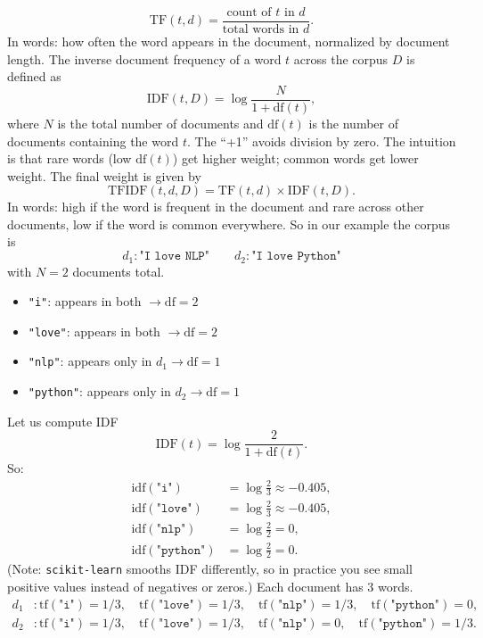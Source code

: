 \[
\mathrm{TF}(t,d) = \frac{\text{count of $t$ in $d$}}{\text{total words in $d$}}.
\]
In words: how often the word appears in the document, normalized by document length. The inverse document frequency of a word $t$ across the corpus $D$ is defined as
\[
\mathrm{IDF}(t,D) = \log \frac{N}{1 + \mathrm{df}(t)},
\]
where $N$ is the total number of documents and $\mathrm{df}(t)$ is the number of documents containing the word $t$. The ``+1'' avoids division by zero.  The intuition is that rare words (low $\mathrm{df}(t)$) get higher weight; common words get lower weight. The final weight is given by
\[
\mathrm{TFIDF}(t,d,D) = \mathrm{TF}(t,d) \times \mathrm{IDF}(t,D).
\]
In words: high if the word is frequent in the document and rare across other documents,  
low if the word is common everywhere. So in our example the corpus is
\[
d_{1} : \texttt{"I love NLP"} \qquad
d_{2} : \texttt{"I love Python"}
\]
with $N = 2$ documents total.
\begin{itemize}
	\item \texttt{"i"}: appears in both $\rightarrow \mathrm{df}=2$
	\item \texttt{"love"}: appears in both $\rightarrow \mathrm{df}=2$
	\item \texttt{"nlp"}: appears only in $d_1 \rightarrow \mathrm{df}=1$
	\item \texttt{"python"}: appears only in $d_2 \rightarrow \mathrm{df}=1$
\end{itemize}
Let us compute IDF
\[
\mathrm{IDF}(t) = \log \frac{2}{1 + \mathrm{df}(t)}.
\]
So:
\[
\begin{aligned}
	\mathrm{idf}(\texttt{"i"}) &= \log \tfrac{2}{3} \approx -0.405, \\
	\mathrm{idf}(\texttt{"love"}) &= \log \tfrac{2}{3} \approx -0.405, \\
	\mathrm{idf}(\texttt{"nlp"}) &= \log \tfrac{2}{2} = 0, \\
	\mathrm{idf}(\texttt{"python"}) &= \log \tfrac{2}{2} = 0.
\end{aligned}
\]
(Note: \texttt{scikit-learn} smooths IDF differently, so in practice you see small positive values instead of negatives or zeros.) Each document has 3 words.
\[
\begin{aligned}
	d_1 &: \mathrm{tf}(\texttt{"i"})=1/3, \quad 
	\mathrm{tf}(\texttt{"love"})=1/3, \quad 
	\mathrm{tf}(\texttt{"nlp"})=1/3, \quad 
	\mathrm{tf}(\texttt{"python"})=0, \\
	d_2 &: \mathrm{tf}(\texttt{"i"})=1/3, \quad 
	\mathrm{tf}(\texttt{"love"})=1/3, \quad 
	\mathrm{tf}(\texttt{"nlp"})=0, \quad 
	\mathrm{tf}(\texttt{"python"})=1/3.
\end{aligned}
\]
